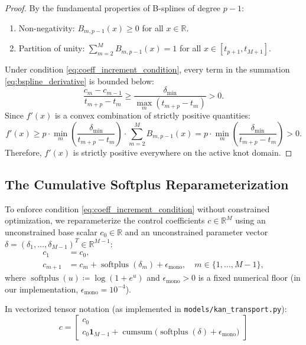 \documentclass[11pt,a4paper]{article}
\theoremstyle{plain}
\theoremstyle{definition}
\theoremstyle{remark}
\begin{document}
\begin{proof}
By the fundamental properties of B-splines of degree $p-1$:
\begin{enumerate}
    \item Non-negativity: $B_{m, p-1}(x) \ge 0$ for all $x \in \mathbb{R}$.
    \item Partition of unity: $\sum_{m=2}^M B_{m, p-1}(x) = 1$ for all $x \in [t_{p+1}, t_{M+1}]$.
\end{enumerate}
Under condition \eqref{eq:coeff_increment_condition}, every term in the summation \eqref{eq:bspline_derivative} is bounded below:
\begin{equation}
    \frac{c_m - c_{m-1}}{t_{m+p} - t_m} \ge \frac{\delta_{\min}}{\max_m(t_{m+p} - t_m)} > 0.
\end{equation}
Since $f'(x)$ is a convex combination of strictly positive quantities:
\begin{equation}
    f'(x) \ge p \cdot \min_{m} \left( \frac{\delta_{\min}}{t_{m+p} - t_m} \right) \cdot \sum_{m=2}^M B_{m, p-1}(x) = p \cdot \min_{m} \left( \frac{\delta_{\min}}{t_{m+p} - t_m} \right) > 0.
\end{equation}
Therefore, $f'(x)$ is strictly positive everywhere on the active knot domain.
\end{proof}

\subsection{The Cumulative Softplus Reparameterization}

To enforce condition \eqref{eq:coeff_increment_condition} without constrained optimization, we reparameterize the control coefficients $c \in \mathbb{R}^M$ using an unconstrained base scalar $c_0 \in \mathbb{R}$ and an unconstrained parameter vector $\delta = (\delta_1, \dots, \delta_{M-1})^T \in \mathbb{R}^{M-1}$:
\begin{align}
    c_1 &= c_0, \\
    c_{m+1} &= c_m + \operatorname{softplus}(\delta_m) + \epsilon_{\text{mono}}, \quad m \in \{1, \dots, M-1\},
    \label{eq:softplus_reparam}
\end{align}
where $\operatorname{softplus}(u) \coloneqq \log(1 + e^u)$ and $\epsilon_{\text{mono}} > 0$ is a fixed numerical floor (in our implementation, $\epsilon_{\text{mono}} = 10^{-4}$).

In vectorized tensor notation (as implemented in \texttt{models/kan\_transport.py}):
\begin{equation}
    \boxed{c = \begin{bmatrix} c_0 \\ c_0 \mathbf{1}_{M-1} + \operatorname{cumsum}\Big( \operatorname{softplus}(\delta) + \epsilon_{\text{mono}} \Big) \end{bmatrix}}
\end{equation}
\end{document}
